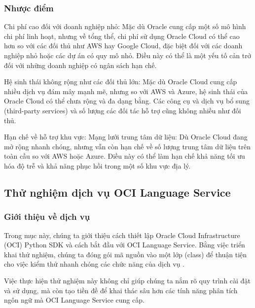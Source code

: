 \subsubsection{Nhược điểm}
\begin{myitem}
    \item Chi phí cao đối với doanh nghiệp nhỏ: Mặc dù Oracle cung cấp một số mô hình chi phí linh hoạt, nhưng về tổng thể, chi phí sử dụng Oracle Cloud có thể cao hơn so với các đối thủ như AWS hay Google Cloud, đặc biệt đối với các doanh nghiệp nhỏ hoặc các dự án có quy mô nhỏ. Điều này có thể là một yếu tố cản trở đối với những doanh nghiệp có ngân sách hạn chế.

    \item Hệ sinh thái không rộng như các đối thủ lớn: Mặc dù Oracle Cloud cung cấp nhiều dịch vụ đám mây mạnh mẽ, nhưng so với AWS và Azure, hệ sinh thái của Oracle Cloud có thể chưa rộng và đa dạng bằng. Các công cụ và dịch vụ bổ sung (third-party services) và số lượng các đối tác hỗ trợ cũng không nhiều như đối thủ.
    
    \item Hạn chế về hỗ trợ khu vực: Mạng lưới trung tâm dữ liệu: Dù Oracle Cloud đang mở rộng nhanh chóng, nhưng vẫn còn hạn chế về số lượng trung tâm dữ liệu trên toàn cầu so với AWS hoặc Azure. Điều này có thể làm hạn chế khả năng tối ưu hóa độ trễ và khả năng phục hồi trong một số khu vực địa lý.

\end{myitem}

\subsection{Thử nghiệm dịch vụ OCI Language Service}
\subsubsection{Giới thiệu về dịch vụ}
Trong mục này, chúng ta giới thiệu cách thiết lập Oracle Cloud Infrastructure (OCI) Python SDK và cách bắt đầu với OCI Language Service. Bằng việc triển khai thử nghiệm, chúng ta đóng gói mã nguồn vào một lớp (class) để thuận tiện cho việc kiểm thử nhanh chóng các chức năng của dịch vụ \cite{medium_exploring_oci_language_service}.

Việc thực hiện thử nghiệm này không chỉ giúp chúng ta nắm rõ quy trình cài đặt và sử dụng, mà còn tạo tiền đề để khai thác sâu hơn các tính năng phân tích ngôn ngữ mà OCI Language Service cung cấp.

